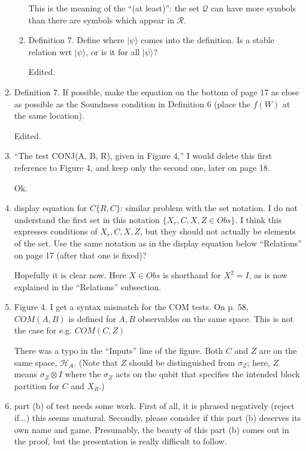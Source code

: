 \documentclass[12pt]{article}
\begin{document}
\begin{enumerate}
\begin{enumerate}
		{\color{blue} This is the meaning of the ``(at least)'': the set $\mathcal{Q}$ can have more symbols than there are symbols which appear in $\mathcal{R}$.}

    \item Definition 7. Define where $|\psi\rangle$ comes into the definition. Is a stable relation wrt $|\psi\rangle$, or is it for all $|\psi\rangle$?
		
				{\color{blue} Edited.}

\end{enumerate}
  \item Definition 7. If possible, make the equation on the bottom of page 17 as close as possible as the Soundness condition in Definition 6 (place the $f(W)$ at the same location).
	
					{\color{blue} Edited.}
	
      \item ``The test
CONJ(A, B, R), given in Figure 4,'' I would delete this first reference to Figure 4, and keep only the second one, later on page 18.

{\color{blue} Ok.}

  \item display equation for $C\{R,C\}$: similar problem with the set notation. I do not understand the first set in this notation $\{X_r, C, X, Z \in Obs\}$. I think this expresses conditions of $X_r, C, X, Z$, but they should not actually be elements of the set. Use the same notation as in the display equation below ``Relations'' on page 17 (after that one is fixed)?
	
	{\color{blue} Hopefully it is clear now. Here $X\in Obs$ is shorthand for $X^2=I$, as is now explained in the ``Relations'' subsection.}

   \item Figure 4. I get a syntax mismatch for the COM tests. On p. 58, $COM(A,B)$ is defined for $A,B$ observables on the same space. This is not the case for e.g. $COM(C,Z)$
	
	{\color{blue} There was a typo in the ``Inputs'' line of the figure. Both $C$ and $Z$ are on the same space, $\mathcal{H}_{A}$. (Note that $Z$ should be distinguished from $\sigma_Z$; here, $Z$ means $\sigma_Z \otimes I$ where the $\sigma_Z$ acts on the qubit that specifies the intended block partition for $C$ and $X_R$.)}

     \item part (b) of test needs some work. First of all, it is phrased negatively (reject if...) this seems unatural. Secondly, please consider if this part (b) deserves its own name and game. Presumably, the beauty of this part (b) comes out in the proof, but the presentation is really difficult to follow.
		

\end{enumerate}
\end{document}
